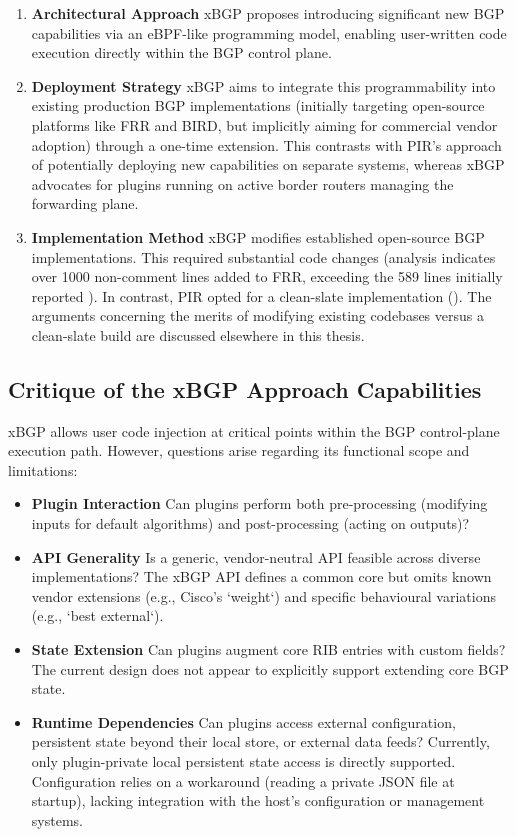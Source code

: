 \begin{enumerate}
    \item \textbf{Architectural Approach} xBGP proposes introducing significant new BGP capabilities via an eBPF-like programming model, enabling user-written code execution directly within the BGP control plane.
    \item \textbf{Deployment Strategy} xBGP aims to integrate this programmability into existing production BGP implementations (initially targeting open-source platforms like FRR and BIRD, but implicitly aiming for commercial vendor adoption) through a one-time extension. This contrasts with PIR's approach of potentially deploying new capabilities on separate systems, whereas xBGP advocates for plugins running on active border routers managing the forwarding plane.
    \item \textbf{Implementation Method} xBGP modifies established open-source BGP implementations. This required substantial code changes (analysis indicates over 1000 non-comment lines added to FRR, exceeding the 589 lines initially reported \cite{Wirtgen2020}). In contrast, PIR opted for a clean-slate implementation (\hbgp). The arguments concerning the merits of modifying existing codebases versus a clean-slate build are discussed elsewhere in this thesis. 
\end{enumerate}

\subsection{Critique of the xBGP Approach Capabilities}

xBGP allows user code injection at critical points within the BGP control-plane execution path. However, questions arise regarding its functional scope and limitations:

\begin{itemize}
    \item \textbf{Plugin Interaction} Can plugins perform both pre-processing (modifying inputs for default algorithms) and post-processing (acting on outputs)?
    \item \textbf{API Generality} Is a generic, vendor-neutral API feasible across diverse implementations? The xBGP API defines a common core but omits known vendor extensions (e.g., Cisco's `weight`) and specific behavioural variations (e.g., `best external`).
    \item \textbf{State Extension} Can plugins augment core RIB entries with custom fields? The current design does not appear to explicitly support extending core BGP state.
    \item \textbf{Runtime Dependencies} Can plugins access external configuration, persistent state beyond their local store, or external data feeds? Currently, only plugin-private local persistent state access is directly supported. Configuration relies on a workaround (reading a private JSON file at startup), lacking integration with the host's configuration or management systems.
\end{itemize}

